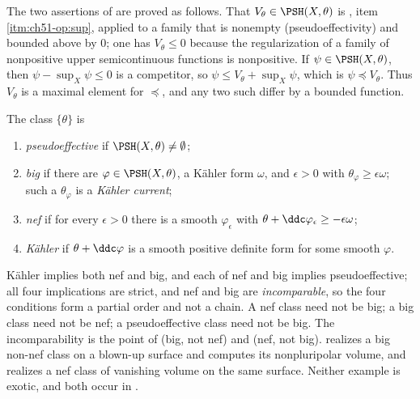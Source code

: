The two assertions of  are proved as
follows.  That \(V_\theta\in\PSH(X,\theta)\) is
, item \cref{itm:ch51-op:sup}, applied to a
family that is nonempty (pseudoeffectivity) and bounded above by \(0\); one
has \(V_\theta\leq0\) because the regularization of a family of
nonpositive upper semicontinuous functions is nonpositive.  If
\(\psi\in\PSH(X,\theta)\), then \(\psi-\sup_X\psi\leq0\) is a competitor,
so \(\psi\leq V_\theta+\sup_X\psi\), which is
\(\psi\preceq V_\theta\).  Thus \(V_\theta\) is a maximal element for
\(\preceq\), and any two such differ by a bounded function.

\begin{definition}
\label{def:ch51-positivity}
The class \(\{\theta\}\) is
\begin{enumerate}
\item \emph{pseudoeffective} if \(\PSH(X,\theta)\neq\emptyset\);
\item \emph{big} if there are \(\varphi\in\PSH(X,\theta)\), a K\"ahler
      form \(\omega\), and \(\epsilon>0\) with
      \(\theta_\varphi\geq\epsilon\omega\); such a
      \(\theta_\varphi\) is a \emph{K\"ahler current};
\item \emph{nef} if for every \(\epsilon>0\) there is a smooth
      \(\varphi_\epsilon\) with
      \(\theta+\ddc\varphi_\epsilon\geq-\epsilon\omega\);
\item \emph{K\"ahler} if \(\theta+\ddc\varphi\) is a smooth positive
      definite form for some smooth \(\varphi\).
\end{enumerate}
\end{definition}

K\"ahler implies both nef and big, and each of nef and big implies
pseudoeffective; all four implications are strict, and nef and big are
\emph{incomparable}, so the four conditions form a partial order and not a
chain.  A nef class need not be big; a big class need not be nef; a
pseudoeffective class need not be big.  The incomparability is the point of
 (big, not nef) and
 (nef, not big).
 realizes a big non-nef class on a blown-up
surface and computes its nonpluripolar volume, and
 realizes a nef class of vanishing volume on
the same surface.  Neither example is exotic, and both occur in
.


